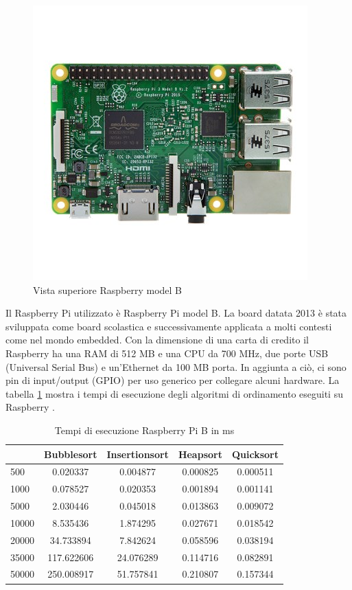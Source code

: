 \documentclass[12pt, a4paper]{report}
\begin{document}
\begin{figure}[ht]
\centering
	\includegraphics[scale=0.5 ]{RBTop.jpeg}
	\caption{Vista superiore Raspberry model B}
	\label{fig:RaspberryB}
\end{figure}

Il Raspberry Pi utilizzato è Raspberry Pi model B. La board datata 2013 è stata sviluppata come board scolastica e successivamente applicata a molti contesti come nel mondo embedded.
Con la dimensione di una carta di credito il Raspberry ha una RAM di 512 MB e una CPU da 700 MHz, due porte USB (Universal Serial Bus) e un'Ethernet da 100 MB porta. In aggiunta a ciò, ci sono pin di input/output (GPIO) per uso generico per collegare alcuni hardware. La tabella \ref{Tab:RaspSorting} mostra i tempi di esecuzione degli algoritmi di ordinamento eseguiti su Raspberry \cite{Rasp}.

\begin{table}[ht]
		\centering
		\begin{tabular}		{| l | c | c | c | c |}
		\hline
		 & Bubblesort & Insertionsort & Heapsort & Quicksort \\ \hline
500 & 0.020337 & 0.004877 & 0.000825 & 0.000511 \\ \hline
1000 & 0.078527	 & 0.020353 & 0.001894 & 0.001141 \\ \hline
5000 & 2.030446 & 0.045018 & 0.013863 & 0.009072 \\ \hline
10000 & 8.535436 & 1.874295 & 0.027671 & 0.018542 \\ \hline
20000 & 34.733894 & 7.842624 & 0.058596 & 0.038194 \\ \hline
35000 & 117.622606 & 24.076289 & 0.114716 & 0.082891 \\ \hline
50000 & 250.008917 & 51.757841 & 0.210807 & 0.157344 \\ \hline

		\end{tabular}
		\caption{Tempi di esecuzione Raspberry Pi B in ms}
		\label{Tab:RaspSorting}
			\end{table}
\end{document}
